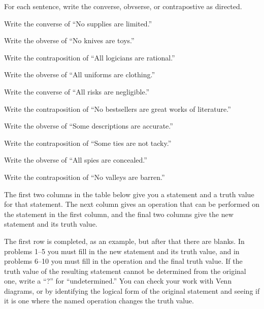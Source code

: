 \noindent \problempart For each sentence, write the converse, obvserse, or contrapostive as directed.
\begin{exercises} 
\item Write the converse of ``No supplies are limited.'' 
\item Write the obverse of ``No knives are toys.'' 
\item Write the contraposition of ``All logicians are rational.'' 
\item Write the obverse of ``All uniforms are clothing.'' 
\item Write the converse of ``All risks are negligible.'' 
\item Write the contraposition of ``No bestsellers are great works of literature.'' 
\item Write the obverse of ``Some descriptions are accurate.'' 
\item Write the contraposition of ``Some ties are not tacky.'' 
\item Write the obverse of ``All spies are concealed.'' 
\item Write the contraposition of ``No valleys are barren.'' 
\end{exercises}


\problempart The first two columns in the table below give you a statement and a truth value for that statement. The next column gives an operation that can be performed on the statement in the first column, and the final two columns give the new statement and its truth value. 

The first row is completed, as an example, but after that there are blanks. In problems 1--5 you must fill in the new statement and its truth value, and in problems 6--10 you must fill in the operation and the final truth value. If the truth value of the resulting statement cannot be determined from the original one, write a ``?'' for ``undetermined.'' You can check your work with Venn diagrams, or by identifying the logical form of the original statement and seeing if it is one where the named operation changes the truth value. 

